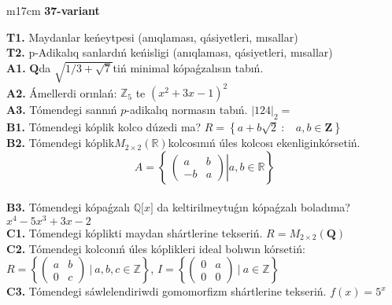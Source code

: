 \documentclass{article}
\begin{document}
\begin{tabular}{m{17cm}}
\textbf{37-variant}
\newline

\textbf{T1.} Maydanlar keńeytpesi (anıqlaması, qásiyetleri, mısallar) \\
\textbf{T2.} p-Adikalıq sanlardıń keńisligi (anıqlaması, qásiyetleri, mısallar) \\
\textbf{A1.} \(\mathbf{Q}\)da \(\sqrt{1/3 + \sqrt{7}}\)tiń minimal kópaǵzalısın tabıń. \\
\textbf{A2.} Ámellerdi orınlań: \(\mathbb{Z}_{5}\) te \(\left( x^{2} + 3x - 1 \right)^{2}\) \\
\textbf{A3.} Tómendegi sannıń \(p\)-adikalıq normasın tabıń. \(|124|_{2} =\) \\
\textbf{B1.} Tómendegi kóplik kolco dúzedi ma? \(R = \left\{ a + b\sqrt{2}\ :\ \ \ \ a,b \in \mathbf{Z} \right\}\) \\
\textbf{B2.} Tómendegi kóplik\(M_{2 \times 2}\left( \mathbb{R} \right)\)kolcosınıń úles kolcosı ekenliginkórsetiń.
\[A = \left\{ \left. \ \begin{pmatrix}
a & b \\
 - b & a
\end{pmatrix} \right|a,b\mathbb{\in R} \right\}\] \\
\textbf{B3.} Tómendegi kópaǵzalı \(\mathbb{Q\lbrack}x\rbrack\) da keltirilmeytuǵın kópaǵzalı boladıma? \(x^{4} - 5x^{3} + 3x - 2\) \\
\textbf{C1.} Tómendegi kóplikti maydan shártlerine tekseriń. \(R = M_{2 \times 2}\left( \mathbf{Q} \right)\) \\
\textbf{C2.} Tómendegi kolconıń úles kóplikleri ideal bolıwın kórsetiń:
\(R = \left\{ \begin{pmatrix}
a & b \\
0 & c
\end{pmatrix}\ |\ a,b,c \in \mathbb{Z} \right\}\), \(I = \left\{ \begin{pmatrix}
0 & a \\
0 & 0
\end{pmatrix}\ |\ a \in \mathbb{Z} \right\}\) \\
\textbf{C3.} Tómendegi sáwlelendiriwdi gomomorfizm shártlerine tekseriń. \(f(x) = 5^{x}\) \\

\end{tabular}
\vspace{1cm}
\end{document}
